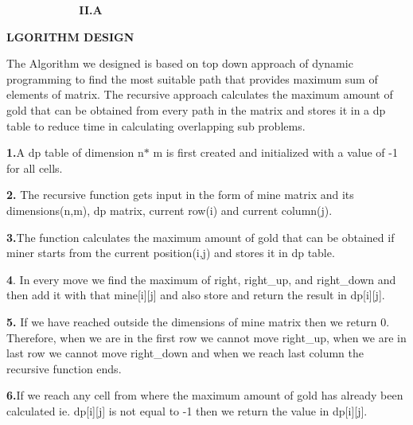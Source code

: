 \documentclass[10pt]{report}
\begin{document}
\begin{multicols}{2}
\vspace{\baselineskip}

\vspace{\baselineskip}
\ \ \ \ \  \textbf{\ \ \ \ \ \ \  II.A}{\fontsize{9pt}{10.8pt}\selectfont \textbf{LGORITHM DESIGN}\par}\par


\vspace{\baselineskip}
The Algorithm we designed is based on top down approach of dynamic programming to find the most suitable path that provides maximum sum of elements of matrix. The recursive approach calculates the maximum amount of gold that can be obtained from every path in the matrix and stores it in a dp table to reduce time in calculating overlapping sub problems.\par


\vspace{\baselineskip}
\textbf{1.}A dp table of dimension n$\ast$ m is first created and initialized with a value of -1 for all cells.\par


\vspace{\baselineskip}
\textbf{2. }The recursive function gets input in the form of mine matrix and its dimensions(n,m), dp matrix, current row(i) and current column(j).\par


\vspace{\baselineskip}
\textbf{3.}The function calculates the maximum amount of gold that can be obtained if miner starts from the current position(i,j) and stores it in dp table.\par


\vspace{\baselineskip}
\textbf{4}. In every move we find the maximum of right, right\_up, and right\_down and then add it with that mine[i][j] and also store and return the result in dp[i][j].\par


\vspace{\baselineskip}
\textbf{5.} If we have reached outside the dimensions of mine matrix then we return 0. Therefore, when we are in the first row we cannot move right\_up, when we are in last row we cannot move right\_down and when we reach last column the recursive function ends.\par


\vspace{\baselineskip}
\textbf{6.}If we reach any cell from where the maximum amount of gold has already been calculated ie. dp[i][j] is not equal to -1 then we return the value in dp[i][j].\par



\end{multicols}
\end{document}

